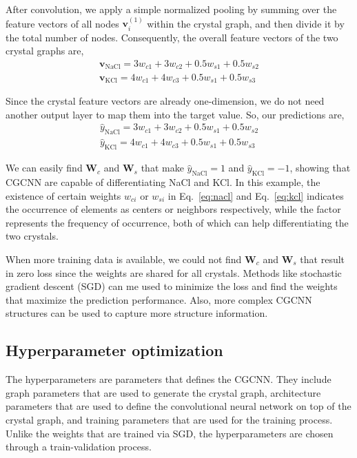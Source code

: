 \documentclass[twocolumn, prl]{revtex4-1}
\begin{document}
After convolution, we apply a simple normalized pooling by summing over the feature vectors of all nodes $\bm{v}_{i}^{(1)}$ within the crystal graph, and then divide it by the total number of nodes. Consequently, the overall feature vectors of the two crystal graphs are,
\begin{align}
  \bm{v}_{\mathrm{NaCl}} = 3 w_{c1} + 3 w_{c2} + 0.5w_{s1} + 0.5w_{s2} \\
  \bm{v}_{\mathrm{KCl}} =  4 w_{c1} + 4 w_{c3} + 0.5w_{s1} + 0.5w_{s3}
\end{align}

Since the crystal feature vectors are already one-dimension, we do not need another output layer to map them into the target value. So, our predictions are,
\begin{align}
  \hat{y}_{\mathrm{NaCl}} = 3 w_{c1} + 3 w_{c2} + 0.5w_{s1} + 0.5w_{s2}\label{eq:nacl} \\
  \hat{y}_{\mathrm{KCl}} =  4 w_{c1} + 4 w_{c3} + 0.5w_{s1} + 0.5w_{s3}\label{eq:kcl}
\end{align}

We can easily find $\bm{W}_c$ and $\bm{W}_s$ that make $\hat{y}_{\mathrm{NaCl}} = 1$ and $\hat{y}_{\mathrm{KCl}} = -1$, showing that CGCNN are capable of differentiating NaCl and KCl. In this example, the existence of certain weights $w_{ci}$ or $w_{si}$ in Eq.~\ref{eq:nacl} and Eq.~\ref{eq:kcl} indicates the occurrence of elements as centers or neighbors respectively, while the factor represents the frequency of occurrence, both of which can help differentiating the two crystals.

When more training data is available, we could not find $\bm{W}_c$ and $\bm{W}_s$ that result in zero loss since the weights are shared for all crystals. Methods like stochastic gradient descent (SGD) can me used to minimize the loss and find the weights that maximize the prediction performance. Also, more complex CGCNN structures can be used to capture more structure information.


\subsection{Hyperparameter optimization}\label{sec:hyper}

The hyperparameters are parameters that defines the CGCNN. They include graph parameters that are used to generate the crystal graph, architecture parameters that are used to define the convolutional neural network on top of the crystal graph, and training parameters that are used for the training process. Unlike the weights that are trained via SGD, the hyperparameters are chosen through a train-validation process.
\end{document}
